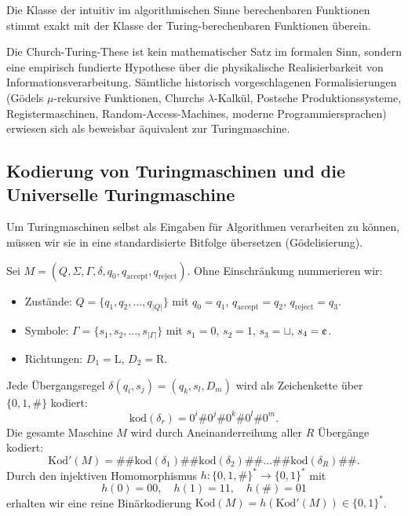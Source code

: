 \begin{theorem}
    Die Klasse der intuitiv im algorithmischen Sinne berechenbaren Funktionen stimmt exakt mit der Klasse der Turing-berechenbaren Funktionen überein.
\end{theorem}

\begin{remark}
    Die Church-Turing-These ist kein mathematischer Satz im formalen Sinn, sondern eine empirisch fundierte Hypothese über die physikalische Realisierbarkeit von Informationsverarbeitung. Sämtliche historisch vorgeschlagenen Formalisierungen (Gödels $\mu$-rekursive Funktionen, Churchs $\lambda$-Kalkül, Postsche Produktionssysteme, Registermaschinen, Random-Access-Machines, moderne Programmiersprachen) erwiesen sich als beweisbar äquivalent zur Turingmaschine.
\end{remark}

\subsection{Kodierung von Turingmaschinen und die Universelle Turingmaschine}

Um Turingmaschinen selbst als Eingaben für Algorithmen verarbeiten zu können, müssen wir sie in eine standardisierte Bitfolge übersetzen (Gödelisierung).

\begin{definition}
    Sei $M = (Q, \Sigma, \Gamma, \delta, q_0, q_{\mathrm{accept}}, q_{\mathrm{reject}})$. Ohne Einschränkung nummerieren wir:
    \begin{itemize}
        \item Zustände: $Q = \{q_1, q_2, \dots, q_{|Q|}\}$ mit $q_0 = q_1$, $q_{\mathrm{accept}} = q_2$, $q_{\mathrm{reject}} = q_3$.
        \item Symbole: $\Gamma = \{s_1, s_2, \dots, s_{|\Gamma|}\}$ mit $s_1 = 0$, $s_2 = 1$, $s_3 = \sqcup$, $s_4 = \text{\textcent}$.
        \item Richtungen: $D_1 = \mathrm{L}$, $D_2 = \mathrm{R}$.
    \end{itemize}
    Jede Übergangsregel $\delta(q_i, s_j) = (q_k, s_l, D_m)$ wird als Zeichenkette über $\{0, 1, \#\}$ kodiert:
    \[
        \mathrm{kod}(\delta_r) = 0^i \# 0^j \# 0^k \# 0^l \# 0^m.
    \]
    Die gesamte Maschine $M$ wird durch Aneinanderreihung aller $R$ Übergänge kodiert:
    \[
        \mathrm{Kod}'(M) = \#\# \mathrm{kod}(\delta_1) \#\# \mathrm{kod}(\delta_2) \#\# \dots \#\# \mathrm{kod}(\delta_R) \#\#.
    \]
    Durch den injektiven Homomorphismus $h : \{0, 1, \#\}^* \to \{0, 1\}^*$ mit
    \[
        h(0) = 00, \quad h(1) = 11, \quad h(\#) = 01
    \]
    erhalten wir eine reine Binärkodierung $\mathrm{Kod}(M) = h(\mathrm{Kod}'(M)) \in \{0, 1\}^*$.
\end{definition}

